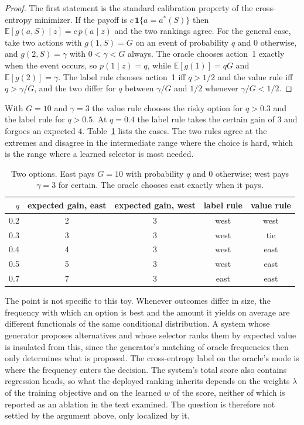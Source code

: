 \documentclass[11pt]{article}
\theoremstyle{definition}
\newcommand{\E}{\mathbb{E}}
\begin{document}
\begin{proof}
The first statement is the standard calibration property of the cross-entropy minimizer. If the payoff is $c\,\mathbf 1\{a=a^\ast(S)\}$ then $\E[g(a,S)\mid z]=c\,p(a\mid z)$ and the two rankings agree. For the general case, take two actions with $g(1,S)=G$ on an event of probability $q$ and $0$ otherwise, and $g(2,S)=\gamma$ with $0<\gamma<G$ always. The oracle chooses action~1 exactly when the event occurs, so $p(1\mid z)=q$, while $\E[g(1)]=qG$ and $\E[g(2)]=\gamma$. The label rule chooses action~1 iff $q>1/2$ and the value rule iff $q>\gamma/G$, and the two differ for $q$ between $\gamma/G$ and $1/2$ whenever $\gamma/G<1/2$.
\end{proof}

With $G=10$ and $\gamma=3$ the value rule chooses the risky option for $q>0.3$ and the label rule for $q>0.5$. At $q=0.4$ the label rule takes the certain gain of $3$ and forgoes an expected $4$. Table~\ref{tab:two} lists the cases. The two rules agree at the extremes and disagree in the intermediate range where the choice is hard, which is the range where a learned selector is most needed.

\begin{table}[h]
\centering
\caption{Two options. East pays $G=10$ with probability $q$ and $0$ otherwise; west pays $\gamma=3$ for certain. The oracle chooses east exactly when it pays.}
\label{tab:two}
\begin{tabular}{rcccc}
\toprule
$q$ & expected gain, east & expected gain, west & label rule & value rule \\
\midrule
0.2 & 2 & 3 & west & west \\
0.3 & 3 & 3 & west & tie \\
0.4 & 4 & 3 & west & east \\
0.5 & 5 & 3 & west & east \\
0.7 & 7 & 3 & east & east \\
\bottomrule
\end{tabular}
\end{table}

The point is not specific to this toy. Whenever outcomes differ in size, the frequency with which an option is best and the amount it yields on average are different functionals of the same conditional distribution. A system whose generator proposes alternatives and whose selector ranks them by expected value is insulated from this, since the generator's matching of oracle frequencies then only determines what is proposed. The cross-entropy label on the oracle's mode is where the frequency enters the decision. The system's total score also contains regression heads, so what the deployed ranking inherits depends on the weights $\lambda$ of the training objective and on the learned $w$ of the score, neither of which is reported as an ablation in the text examined. The question is therefore not settled by the argument above, only localized by it.
\end{document}
